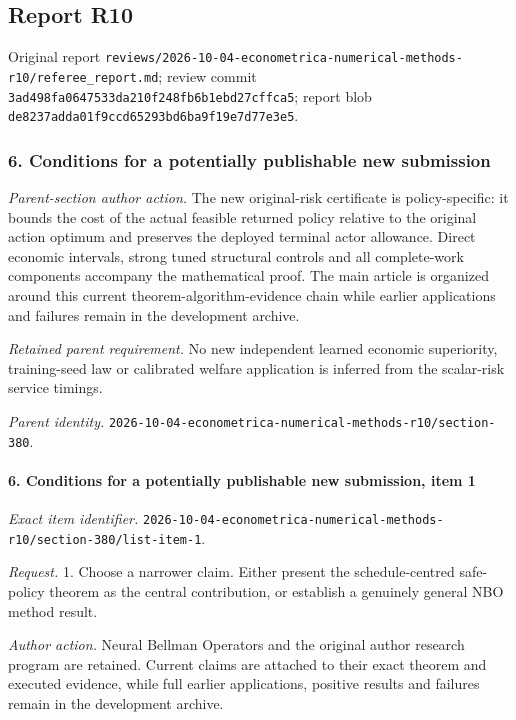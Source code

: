 \subsection{Report R10}

Original report \nolinkurl{reviews/2026-10-04-econometrica-numerical-methods-r10/referee_report.md}; review commit \nolinkurl{3ad498fa0647533da210f248fb6b1ebd27cffca5}; report blob \nolinkurl{de8237adda01f9ccd65293bd6ba9f19e7d77e3e5}.

\subsubsection{6. Conditions for a potentially publishable new submission}

\emph{Parent-section author action.} The new original-risk certificate is policy-specific: it bounds the cost of the actual feasible returned policy relative to the original action optimum and preserves the deployed terminal actor allowance. Direct economic intervals, strong tuned structural controls and all complete-work components accompany the mathematical proof. The main article is organized around this current theorem-algorithm-evidence chain while earlier applications and failures remain in the development archive.

\par\emph{Retained parent requirement.} No new independent learned economic superiority, training-seed law or calibrated welfare application is inferred from the scalar-risk service timings.

\par\emph{Parent identity.} \nolinkurl{2026-10-04-econometrica-numerical-methods-r10/section-380}.

\paragraph{6. Conditions for a potentially publishable new submission, item 1}

\emph{Exact item identifier.} \nolinkurl{2026-10-04-econometrica-numerical-methods-r10/section-380/list-item-1}.

\par\emph{Request.} 1. Choose a narrower claim. Either present the schedule-centred safe-policy theorem as the central contribution, or establish a genuinely general NBO method result.

\par\emph{Author action.} Neural Bellman Operators and the original author research program are retained. Current claims are attached to their exact theorem and executed evidence, while full earlier applications, positive results and failures remain in the development archive.

